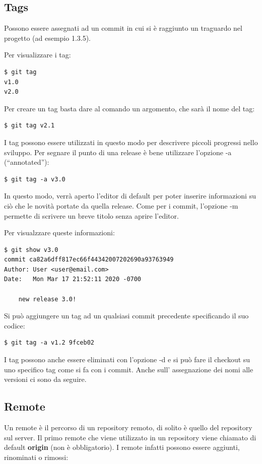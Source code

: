 \documentclass{article}
\begin{document}
\subsection{Tags}
Possono essere assegnati ad un commit in cui si è raggiunto un traguardo nel
progetto (ad esempio 1.3.5).

Per visualizzare i tag:

\begin{verbatim}
$ git tag
v1.0
v2.0
\end{verbatim}

Per creare un tag basta dare al comando un argomento, che sarà il nome del tag:

\begin{verbatim}
$ git tag v2.1
\end{verbatim}

I tag possono essere utilizzati in questo modo per descrivere piccoli progressi
nello sviluppo. Per segnare il punto di una release è bene utilizzare l'opzione
-a (``annotated''): 

\begin{verbatim}
$ git tag -a v3.0
\end{verbatim}

In questo modo, verrà aperto l'editor di default per poter inserire informazioni
su ciò che le novità portate da quella release. Come per i commit, l'opzione -m
permette di scrivere un breve titolo senza aprire l'editor.

Per visualzzare queste informazioni:

\begin{verbatim}
$ git show v3.0
commit ca82a6dff817ec66f44342007202690a93763949
Author: User <user@email.com>
Date:   Mon Mar 17 21:52:11 2020 -0700

    new release 3.0!
\end{verbatim}

Si può aggiungere un tag ad un qualsiasi commit precedente specificando il suo
codice:

\begin{verbatim}
$ git tag -a v1.2 9fceb02
\end{verbatim}

I tag possono anche essere eliminati con l'opzione -d e si può fare il checkout
su uno specifico tag come si fa con i commit.
Anche sull' assegnazione dei nomi alle versioni ci sono
 da seguire.

\subsection{Remote\label{remoti}}
Un remote è il percorso di un repository remoto, di solito è quello del
repository sul server. Il primo remote che viene utilizzato in un repository
viene chiamato di default \textbf{origin} (non è obbligatorio). I remote infatti
possono essere aggiunti, rinominati o rimossi:
\end{document}
